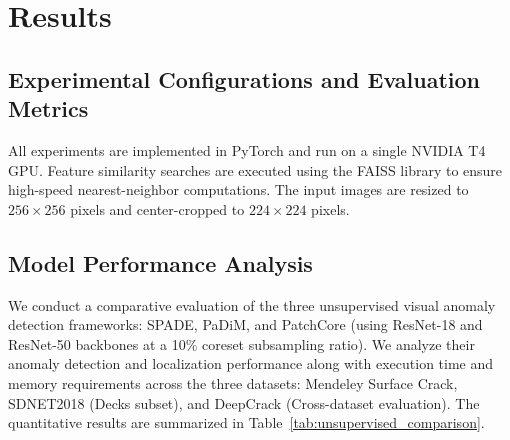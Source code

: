 \documentclass[runningheads]{llncs}
\begin{document}
\section{Results}
\label{sec:results}

\subsection{Experimental Configurations and Evaluation Metrics}
All experiments are implemented in PyTorch and run on a single NVIDIA T4 GPU. Feature similarity searches are executed using the FAISS library to ensure high-speed nearest-neighbor computations. The input images are resized to $256 \times 256$ pixels and center-cropped to $224 \times 224$ pixels. 

\subsection{Model Performance Analysis}
We conduct a comparative evaluation of the three unsupervised visual anomaly detection frameworks: SPADE, PaDiM, and PatchCore (using ResNet-18 and ResNet-50 backbones at a 10\% coreset subsampling ratio). We analyze their anomaly detection and localization performance along with execution time and memory requirements across the three datasets: Mendeley Surface Crack, SDNET2018 (Decks subset), and DeepCrack (Cross-dataset evaluation). The quantitative results are summarized in Table~\ref{tab:unsupervised_comparison}.
\end{document}
